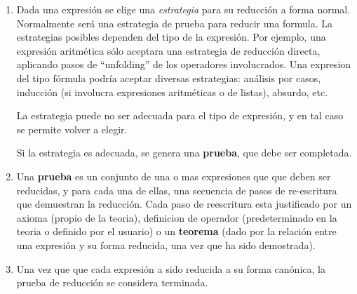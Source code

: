 \documentclass{article}
\begin{document}
\begin{enumerate}
\item Dada una expresión se elige una \emph{estrategia} para su reducción
  a forma normal. Normalmente será una estrategia de prueba para reducir una
  formula. La estrategias posibles dependen del tipo de la expresión. Por 
  ejemplo, una expresión aritmética sólo aceptara una estrategia de
  reducción directa, aplicando pasos de ``unfolding'' de los operadores
  involucrados. Una expresion del tipo fórmula podría aceptar diversas 
  estrategias: análisis por casos, inducción (si involucra expresiones 
  aritméticas o de listas), absurdo, etc.
  
  La estrategia puede no ser adecuada para el tipo de expresión, y en tal caso
  se permite volver a elegir.
  
  Si la estrategia es adecuada, se genera una \textbf{prueba}, que debe ser 
  completada.
  
\item Una \textbf{prueba} es un conjunto de una o mas expresiones que
  que deben ser reducidas, y para cada una de ellas, una secuencia de pasos de 
  re-escritura que demuestran la reducción. Cada paso de reescritura esta
  justificado por un axioma (propio de la teoria), definicion de operador
  (predeterminado en la teoria o definido por el usuario) o un \textbf{teorema}
  (dado por la relación entre una expresión y su forma reducida, una vez
  que ha sido demostrada).
  
\item Una vez que que cada expresión a sido reducida a su forma canónica, 
  la prueba de reducción se considera terminada.
\end{enumerate}
\end{document}

